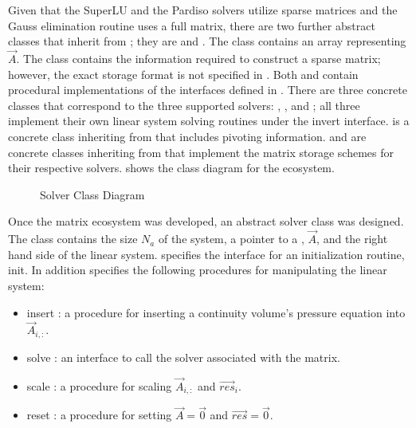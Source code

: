 Given that the SuperLU and the Pardiso solvers utilize sparse matrices and the Gauss elimination routine uses a full matrix, there are two further abstract classes that inherit from ; they are  and .
The  class contains an array representing $\vec{A}$.
The  class contains the information required to construct a sparse matrix; however, the exact storage format is not specified in .
Both  and  contain procedural implementations of the interfaces defined in .
There are three concrete classes that correspond to the three supported solvers: , , and ; all three implement their own linear system solving routines under the invert interface.
 is a concrete class inheriting from  that includes pivoting information.
 and  are concrete classes inheriting from  that implement the matrix storage schemes for their respective solvers.
 shows the class diagram for the  ecosystem.

\begin{figure}[h!]
\singlespace\centering

\caption{Solver Class Diagram}
\label{fig:solverClassDiagram}
\end{figure}

Once the matrix ecosystem was developed, an abstract solver class was designed.
The  class contains the size $N_{a}$ of the system, a pointer to a , $\vec{A}$, and the right hand side of the linear system.
 specifies the interface for an initialization routine, init.
In addition  specifies the following procedures for manipulating the linear system:

\begin{itemize}
\item{ insert : a procedure for inserting a continuity volume's pressure equation into $\vec{A}_{i, :}$.}
\item{ solve : an interface to call the solver associated with the matrix.}
\item{ scale : a procedure for scaling $\vec{A}_{i, :}$ and $\vec{res}_{i}$.}
\item{ reset : a procedure for setting $\vec{A} = \vec{0}$ and $\vec{res} = \vec{0}$.}
\end{itemize}

